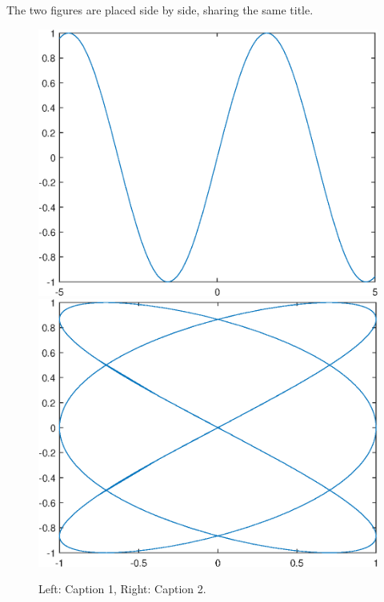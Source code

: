 \documentclass[openany,twoside,12pt]{book}
\theoremstyle{plain}
\numberwithin{equation}{chapter}
\numberwithin{figure}{chapter}
\numberwithin{table}{chapter}
\begin{document}
\clearpage
The two figures are placed side by side, sharing the same title.
\begin{figure}[htp!]
  \centering
  \includegraphics[width=0.45\linewidth]{image1}
  \hfill
  \includegraphics[width=0.45\linewidth]{image2}
  \caption{Left: Caption 1, Right: Caption 2.}
  \label{fig:b}
\end{figure}
\end{document}
